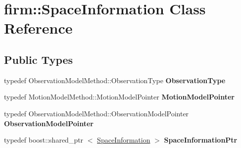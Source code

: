 \hypertarget{classfirm_1_1_space_information}{\section{firm\-:\-:\-Space\-Information \-Class \-Reference}
\label{classfirm_1_1_space_information}
}
\subsection*{\-Public \-Types}
\begin{DoxyCompactItemize}
\item 
\hypertarget{classfirm_1_1_space_information_ad686051bf31885cb46d10e5c9016a6df}{typedef \*
\-Observation\-Model\-Method\-::\-Observation\-Type {\bfseries \-Observation\-Type}}\label{classfirm_1_1_space_information_ad686051bf31885cb46d10e5c9016a6df}

\item 
\hypertarget{classfirm_1_1_space_information_a2caa53f8f7037e2f1b8d70c1077dcf9a}{typedef \*
\-Motion\-Model\-Method\-::\-Motion\-Model\-Pointer {\bfseries \-Motion\-Model\-Pointer}}\label{classfirm_1_1_space_information_a2caa53f8f7037e2f1b8d70c1077dcf9a}

\item 
\hypertarget{classfirm_1_1_space_information_aa31878712d7b14cdaa406dc7b20c8704}{typedef \*
\-Observation\-Model\-Method\-::\-Observation\-Model\-Pointer {\bfseries \-Observation\-Model\-Pointer}}\label{classfirm_1_1_space_information_aa31878712d7b14cdaa406dc7b20c8704}

\item 
\hypertarget{classfirm_1_1_space_information_a6efa9b59d35d1f83427a86271bd47a66}{typedef boost\-::shared\-\_\-ptr\*
$<$ \hyperlink{classfirm_1_1_space_information}{\-Space\-Information} $>$ {\bfseries \-Space\-Information\-Ptr}}\label{classfirm_1_1_space_information_a6efa9b59d35d1f83427a86271bd47a66}

\end{DoxyCompactItemize}
